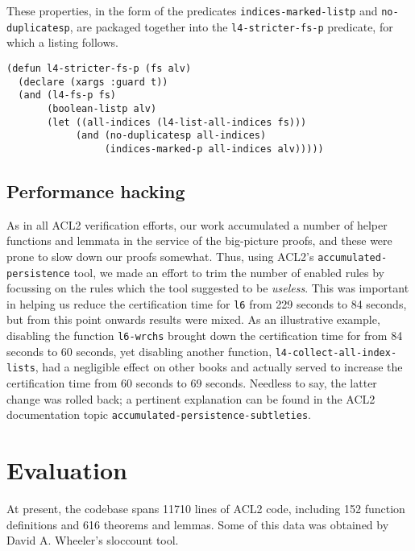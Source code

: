 \documentclass[runningheads,a4paper]{llncs}
\begin{document}
These properties, in the form of the predicates
\texttt{indices-marked-listp} and \texttt{no-duplicatesp}, are
packaged together into the \texttt{l4-stricter-fs-p} predicate, for
which a listing follows.

\medskip

\noindent
\begin{verbatim}
(defun l4-stricter-fs-p (fs alv)
  (declare (xargs :guard t))
  (and (l4-fs-p fs)
       (boolean-listp alv)
       (let ((all-indices (l4-list-all-indices fs)))
            (and (no-duplicatesp all-indices)
                 (indices-marked-p all-indices alv)))))
\end{verbatim}

\subsection{Performance hacking}

As in all ACL2 verification efforts, our work accumulated a number of
helper functions and lemmata in the service of the big-picture proofs,
and these were prone to slow down our proofs somewhat. Thus, using
ACL2's \texttt{accumulated-persistence} tool, we made an effort to
trim the number of enabled rules by focussing on the rules which the
tool suggested to be \textit{useless}. This was important in helping us reduce
the certification time for \texttt{l6} from 229 seconds to 84 seconds,
but from this point onwards results were mixed. As an illustrative
example, disabling the function \texttt{l6-wrchs} brought down the
certification time for  from 84 seconds to 60 seconds, yet
disabling another function, \texttt{l4-collect-all-index-lists}, had a
negligible effect on other books and actually served to increase the
certification time from 60 seconds to 69 seconds. Needless to say, the
latter change was rolled back; a pertinent explanation can be found in
the ACL2 documentation topic \texttt{accumulated-persistence-subtleties}.


\section{Evaluation}
At present, the codebase spans 11710 lines of ACL2 code, including 152
function definitions and 616 theorems and lemmas. Some of this data was
obtained by David A. Wheeler's sloccount tool.
\end{document}
